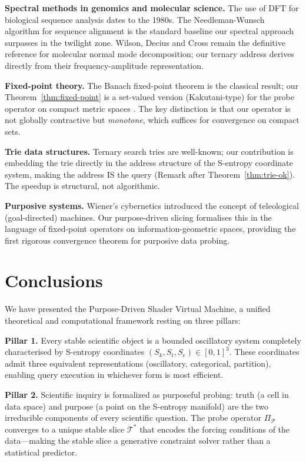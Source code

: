 \documentclass[10pt,twocolumn]{article}
\newcommand{\ProbeOp}{\Pi_\mathcal{P}}
\newcommand{\TruthCell}{\mathcal{T}}
\begin{document}
\textbf{Spectral methods in genomics and molecular science.}
The use of DFT for biological sequence analysis dates to the 1980s.
The Needleman-Wunsch algorithm \cite{needleman1970} for sequence alignment
is the standard baseline our spectral approach surpasses in the twilight zone.
Wilson, Decius and Cross \cite{wilson1955} remain the definitive reference
for molecular normal mode decomposition; our ternary address derives
directly from their frequency-amplitude representation.

\textbf{Fixed-point theory.}
The Banach fixed-point theorem \cite{banach1922} is the classical result;
our Theorem~\ref{thm:fixed-point} is a set-valued version (Kakutani-type)
for the probe operator on compact metric spaces \cite{dunford1988}.
The key distinction is that our operator is not globally contractive
but \emph{monotone}, which suffices for convergence on compact sets.

\textbf{Trie data structures.}
Ternary search tries \cite{knuth1997} are well-known; our contribution
is embedding the trie directly in the address structure of the S-entropy
coordinate system, making the address IS the query (Remark after
Theorem~\ref{thm:trie-ok}). The speedup is structural, not algorithmic.

\textbf{Purposive systems.}
Wiener's cybernetics \cite{wiener1948} introduced the concept of teleological
(goal-directed) machines. Our purpose-driven slicing formalises this
in the language of fixed-point operators on information-geometric spaces,
providing the first rigorous convergence theorem for purposive data probing.

\section{Conclusions}
\label{sec:conclusions}

We have presented the Purpose-Driven Shader Virtual Machine, a unified
theoretical and computational framework resting on three pillars:

\textbf{Pillar 1.} Every stable scientific object is a bounded oscillatory system
completely characterised by S-entropy coordinates $(S_k, S_t, S_e) \in [0,1]^3$.
These coordinates admit three equivalent representations (oscillatory, categorical,
partition), enabling query execution in whichever form is most efficient.

\textbf{Pillar 2.} Scientific inquiry is formalized as purposeful probing:
truth (a cell in data space) and purpose (a point on the S-entropy manifold)
are the two irreducible components of every scientific question.
The probe operator $\ProbeOp$ converges to a unique stable slice $\TruthCell^*$
that encodes the forcing conditions of the data---making the stable slice
a generative constraint solver rather than a statistical predictor.
\end{document}
